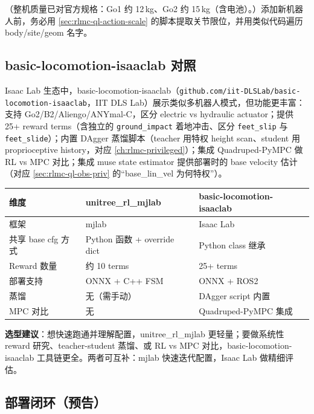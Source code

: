 （整机质量已对官方规格：Go1 约 12\,kg、Go2 约 15\,kg（含电池）。）添加新机器人前，务必用 \cref{sec:rlmc-ql-action-scale} 的脚本提取关节限位，并用类似代码遍历 body/site/geom 名字。

\subsection{basic-locomotion-isaaclab 对照}
\label{sec:rlmc-ql-multirobot-basic}

Isaac Lab 生态中，basic-locomotion-isaaclab（\verb|github.com/iit-DLSLab/basic-locomotion-isaaclab|，IIT DLS Lab）展示类似多机器人模式，但功能更丰富：支持 Go2/B2/Aliengo/ANYmal-C，区分 electric vs hydraulic actuator；提供 25+ reward terms（含独立的 \verb|ground_impact| 着地冲击、区分 \verb|feet_slip| 与 \verb|feet_slide|）；内置 DAgger 蒸馏脚本（teacher 用特权 height scan、student 用 proprioceptive history，对应 \cref{ch:rlmc-privileged}）；集成 Quadruped-PyMPC 做 RL vs MPC 对比；集成 muse state estimator 提供部署时的 base velocity 估计（对应 \cref{sec:rlmc-ql-obs-priv} 的“base\_lin\_vel 为何特权”）。

\begin{center}
\small
\begin{tabular}{@{}lll@{}}
\toprule
维度 & unitree\_rl\_mjlab & basic-locomotion-isaaclab \\
\midrule
框架 & mjlab & Isaac Lab \\
共享 base cfg 方式 & Python 函数 + override dict & Python class 继承 \\
Reward 数量 & 约 10 terms & 25+ terms \\
部署支持 & ONNX + C++ FSM & ONNX + ROS2 \\
蒸馏 & 无（需手动） & DAgger script 内置 \\
MPC 对比 & 无 & Quadruped-PyMPC 集成 \\
\bottomrule
\end{tabular}
\end{center}

\textbf{选型建议}：想快速跑通并理解配置，unitree\_rl\_mjlab 更轻量；要做系统性 reward 研究、teacher-student 蒸馏、或 RL vs MPC 对比，basic-locomotion-isaaclab 工具链更全。两者可互补：mjlab 快速迭代配置，Isaac Lab 做精细评估。

\subsection{部署闭环（预告）}
\label{sec:rlmc-ql-multirobot-deploy}

